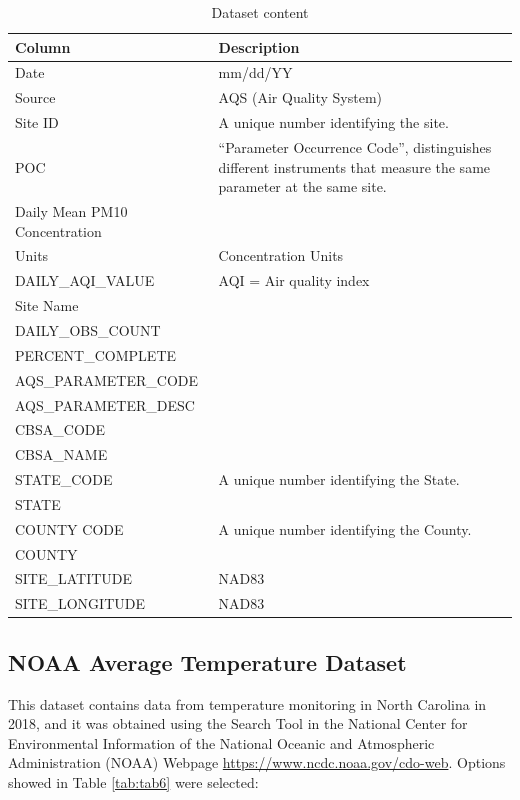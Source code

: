 \documentclass[12pt,]{article}
\begin{document}
\begin{table}[ht]
\centering
\begin{tabular}{p{2.5in}p{3.5in}}
  \hline
Column & Description \\ 
  \hline
Date & mm/dd/YY \\ 
  Source & AQS (Air Quality System) \\ 
  Site ID & A unique number identifying the site. \\ 
  POC & “Parameter Occurrence Code”, distinguishes different instruments that measure the same parameter at the same site. \\ 
  Daily Mean PM10 Concentration &  \\ 
  Units & Concentration Units \\ 
  DAILY\_AQI\_VALUE & AQI = Air quality index \\ 
  Site Name &  \\ 
  DAILY\_OBS\_COUNT &  \\ 
  PERCENT\_COMPLETE &  \\ 
  AQS\_PARAMETER\_CODE &  \\ 
  AQS\_PARAMETER\_DESC &  \\ 
  CBSA\_CODE &  \\ 
  CBSA\_NAME &  \\ 
  STATE\_CODE & A unique number identifying the State. \\ 
  STATE &  \\ 
  COUNTY CODE & A unique number identifying the County. \\ 
  COUNTY &  \\ 
  SITE\_LATITUDE & NAD83 \\ 
  SITE\_LONGITUDE & NAD83 \\ 
   \hline
\end{tabular}
\caption{Dataset content} 
\label{tab:tab5}
\end{table}

\subsection{NOAA Average Temperature
Dataset}\label{noaa-average-temperature-dataset}

This dataset contains data from temperature monitoring in North Carolina
in 2018, and it was obtained using the Search Tool in the National
Center for Environmental Information of the National Oceanic and
Atmospheric Administration (NOAA) Webpage
\url{https://www.ncdc.noaa.gov/cdo-web}. Options showed in Table
\ref{tab:tab6} were selected:
\end{document}
